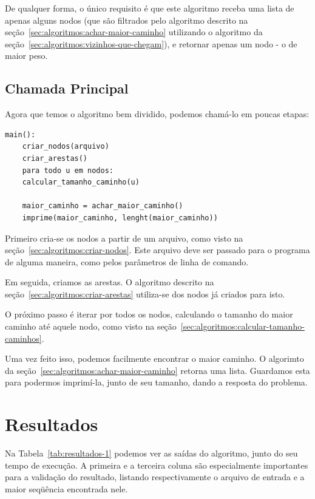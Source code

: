 \documentclass[12pt]{article}
\begin{document}
De qualquer forma, o único requisito é que este algoritmo receba uma lista de apenas alguns nodos (que são filtrados pelo algoritmo descrito na se\c{c}ão~\ref{sec:algoritmos:achar-maior-caminho} utilizando o algoritmo da se\c{c}ão~\ref{sec:algoritmos:vizinhos-que-chegam}), e retornar apenas um nodo - o de maior peso.

\subsection{Chamada Principal}\label{sec:algoritmos:main}
Agora que temos o algoritmo bem dividido, podemos chamá-lo em poucas etapas:

\begin{lstlisting}
main():
    criar_nodos(arquivo)
    criar_arestas()
    para todo u em nodos:
    calcular_tamanho_caminho(u)

    maior_caminho = achar_maior_caminho()
    imprime(maior_caminho, lenght(maior_caminho))
\end{lstlisting}

Primeiro cria-se os nodos a partir de um arquivo, como visto na se\c{c}ão~\ref{sec:algoritmos:criar-nodos}. Este arquivo deve ser passado para o programa de alguma maneira, como pelos parâmetros de linha de comando.

Em seguida, criamos as arestas. O algoritmo descrito na se\c{c}ão~\ref{sec:algoritmos:criar-arestas} utiliza-se dos nodos já criados para isto.

O próximo passo é iterar por todos os nodos, calculando o tamanho do maior caminho até aquele nodo, como visto na se\c{c}ão~\ref{sec:algoritmos:calcular-tamanho-caminhos}.

Uma vez feito isso, podemos facilmente encontrar o maior caminho. O algorimto da se\c{c}ão~\ref{sec:algoritmos:achar-maior-caminho} retorna uma lista. Guardamos esta para podermos imprimí-la, junto de seu tamanho, dando a resposta do problema.

\section{Resultados}\label{sec:resultados}

Na Tabela~\ref{tab:resultados-1} podemos ver as saídas do algoritmo, junto do seu tempo de execu\c{c}ão. A primeira e a terceira coluna são especialmente importantes para a valida\c{c}ão do resultado, listando respectivamente o arquivo de entrada e a maior seqüência encontrada nele.
\end{document}
